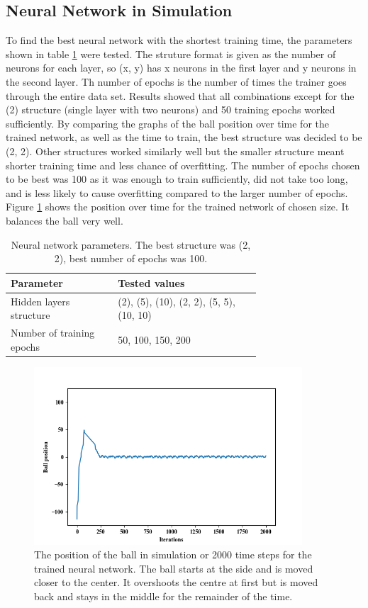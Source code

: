 \documentclass[12pt,a4paper]{article}
\begin{document}
\subsection{Neural Network in Simulation}
To find the best neural network with the shortest training time, the parameters shown in table \ref{nn_params} were tested. The struture format is given as the number of neurons for each layer, so (x, y) has x neurons in the first layer and y neurons in the second layer. Th number of epochs is the number of times the trainer goes through the entire data set. Results showed that all combinations except for the (2) structure (single layer with two neurons) and 50 training epochs worked sufficiently. By comparing the graphs of the ball position over time for the trained network, as well as the time to train, the best structure was decided to be (2, 2). Other structures worked similarly well but the smaller structure meant shorter training time and less chance of overfitting. The number of epochs chosen to be best was 100 as it was enough to train sufficiently, did not take too long, and is less likely to cause overfitting compared to the larger number of epochs. Figure \ref{nn_param_test} shows the position over time for the trained network of chosen size. It balances the ball very well.
\begin{table}[htb]
\centering
\caption{Neural network parameters. The best structure was (2, 2), best number of epochs was 100.}
\label{nn_params}
\begin{tabular}{>{\raggedright}p{0.3\linewidth}p{0.4\linewidth}}\hline
Parameter & Tested values\\ \hline\hline
Hidden layers structure & (2), (5), (10), (2, 2), (5, 5), (10, 10)\\ \hline
Number of training epochs & 50, 100, 150, 200\\ \hline
\end{tabular}
\end{table}
\begin{figure}[H]
	\centering
	\includegraphics[width=10cm]{86_nn}
	\caption{The position of the ball in simulation or 2000 time steps for the trained neural network. The ball starts at the side and is moved closer to the center. It overshoots the centre at first but is moved back and stays in the middle for the remainder of the time.}
	\label{nn_param_test}
\end{figure}
\end{document}
